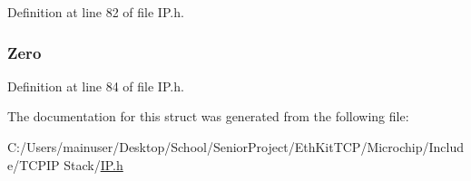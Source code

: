 Definition at line 82 of file I\+P.\+h.

\hypertarget{struct___p_s_e_u_d_o___h_e_a_d_e_r_aa6d4c439169ac792940a0ba329d64e25}{}
\subsubsection[{Zero}]{ Zero}\label{struct___p_s_e_u_d_o___h_e_a_d_e_r_aa6d4c439169ac792940a0ba329d64e25}


Definition at line 84 of file I\+P.\+h.



The documentation for this struct was generated from the following file\+:\begin{DoxyCompactItemize}
\item 
C\+:/\+Users/mainuser/\+Desktop/\+School/\+Senior\+Project/\+Eth\+Kit\+T\+C\+P/\+Microchip/\+Include/\+T\+C\+P\+I\+P Stack/\hyperlink{_i_p_8h}{I\+P.\+h}\end{DoxyCompactItemize}
